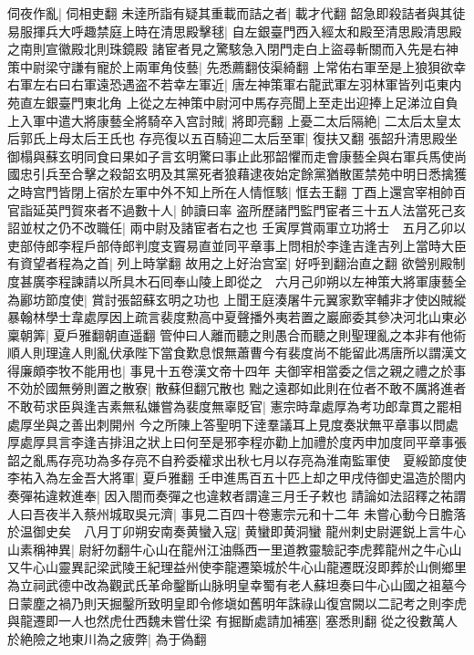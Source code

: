 伺夜作亂|{
	伺相吏翻}
未逹所詣有疑其重載而詰之者|{
	載才代翻}
韶急即殺詰者與其徒易服揮兵大呼趣禁庭上時在清思殿擊毬|{
	自左銀臺門西入經太和殿至清思殿清思殿之南則宣徽殿北則珠鏡殿}
諸宦者見之驚駭急入閉門走白上盜尋斬關而入先是右神策中尉梁守謙有寵於上兩軍角伎藝|{
	先悉薦翻伎渠綺翻}
上常佑右軍至是上狼狽欲幸右軍左右曰右軍遠恐遇盗不若幸左軍近|{
	唐左神策軍右龍武軍左羽林軍皆列屯東内苑直左銀臺門東北角}
上從之左神策中尉河中馬存亮聞上至走出迎捧上足涕泣自負上入軍中遣大將康藝全將騎卒入宫討賊|{
	將即亮翻}
上憂二太后隔絶|{
	二太后太皇太后郭氏上母太后王氏也}
存亮復以五百騎迎二太后至軍|{
	復扶又翻}
張韶升清思殿坐御榻與蘇玄明同食曰果如子言玄明驚曰事止此邪韶懼而走會康藝全與右軍兵馬使尚國忠引兵至合擊之殺韶玄明及其黨死者狼藉逮夜始定餘黨猶散匿禁苑中明日悉擒獲之時宫門皆閉上宿於左軍中外不知上所在人情恇駭|{
	恇去王翻}
丁酉上還宫宰相帥百官詣延英門賀來者不過數十人|{
	帥讀曰率}
盗所歷諸門監門宦者三十五人法當死己亥詔並杖之仍不改職任|{
	兩中尉及諸宦者右之也}
壬寅厚賞兩軍立功將士　五月乙卯以吏部侍郎李程戶部侍郎判度支竇易直並同平章事上問相於李逢吉逢吉列上當時大臣有資望者程為之首|{
	列上時掌翻}
故用之上好治宫室|{
	好呼到翻治直之翻}
欲營别殿制度甚廣李程諫請以所具木石囘奉山陵上即從之　六月己卯朔以左神策大將軍康藝全為酈坊節度使|{
	賞討張韶蘇玄明之功也}
上聞王庭湊屠牛元翼家歎宰輔非才使凶賊縱暴翰林學士韋處厚因上疏言裴度勲高中夏聲播外夷若置之巖廊委其參决河北山東必稟朝筭|{
	夏戶雅翻朝直遥翻}
管仲曰人離而聽之則愚合而聽之則聖理亂之本非有他術順人則理違人則亂伏承陛下當食歎息恨無蕭曹今有裴度尚不能留此馮唐所以謂漢文得廉頗李牧不能用也|{
	事見十五卷漢文帝十四年}
夫御宰相當委之信之親之禮之於事不効於國無勞則置之散寮|{
	散蘇但翻冗散也}
黜之遠郡如此則在位者不敢不厲將進者不敢苟求臣與逢吉素無私嫌嘗為裴度無辜貶官|{
	憲宗時韋處厚為考功郎韋貫之罷相處厚坐與之善出刺開州}
今之所陳上答聖明下逹羣議耳上見度奏狀無平章事以問處厚處厚具言李逢吉排沮之狀上曰何至是邪李程亦勸上加禮於度丙申加度同平章事張韶之亂馬存亮功為多存亮不自矜委權求出秋七月以存亮為淮南監軍使　夏綏節度使李祐入為左金吾大將軍|{
	夏戶雅翻}
壬申進馬百五十匹上却之甲戌侍御史温造於閤内奏彈祐違敕進奉|{
	因入閤而奏彈之也違敕者謂違三月壬子敕也}
請論如法詔釋之祐謂人曰吾夜半入蔡州城取吳元濟|{
	事見二百四十卷憲宗元和十二年}
未嘗心動今日膽落於温御史矣　八月丁卯朔安南奏黄蠻入寇|{
	黄蠻即黄洞蠻}
龍州刺史尉遲鋭上言牛心山素稱神異|{
	尉紆勿翻牛心山在龍州江油縣西一里道教靈驗記李虎葬龍州之牛心山又牛心山靈異記梁武陵王紀理益州使李龍遷築城於牛心山龍遷既沒即葬於山側鄉里為立祠武德中改為觀武氏革命鑿斷山脉明皇幸蜀有老人蘇坦奏曰牛心山國之祖墓今日蒙塵之禍乃則天掘鑿所致明皇即令修塡如舊明年誅祿山復宫闕以二記考之則李虎與龍遷即一人也然虎仕西魏未嘗仕梁}
有掘斷處請加補塞|{
	塞悉則翻}
從之役數萬人於絶險之地東川為之疲弊|{
	為于偽翻}
